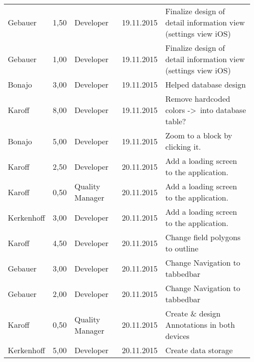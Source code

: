 \begin{longtable}{ l r p{2cm} c p{4cm} }
		Gebauer                 & 1,50           & Developer             & 19.11.2015    & Finalize design of detail information view (settings view iOS)                  \\
		Gebauer                 & 1,00           & Developer             & 19.11.2015    & Finalize design of detail information view (settings view iOS)                  \\
		Bonajo                  & 3,00           & Developer             & 19.11.2015    & Helped database design                                                          \\
		Karoff                  & 8,00           & Developer             & 19.11.2015    & Remove hardcoded colors -\textgreater\ into database table?                      \\
		Bonajo                  & 5,00           & Developer             & 19.11.2015    & Zoom to a block by clicking it.                                                 \\
		Karoff                  & 2,50           & Developer             & 20.11.2015    & Add a loading screen to the application.                                        \\
		Karoff                  & 0,50           & Quality Manager       & 20.11.2015    & Add a loading screen to the application.                                        \\
		Kerkenhoff              & 3,00           & Developer             & 20.11.2015    & Add a loading screen to the application.                                        \\
		Karoff                  & 4,50           & Developer             & 20.11.2015    & Change field polygons to outline                                                \\
		Gebauer                 & 3,00           & Developer             & 20.11.2015    & Change Navigation to tabbedbar                                                  \\
		Gebauer                 & 2,00           & Developer             & 20.11.2015    & Change Navigation to tabbedbar                                                  \\
		Karoff                  & 0,50           & Quality Manager       & 20.11.2015    & Create \& design Annotations in both devices                                    \\
		Kerkenhoff              & 5,00           & Developer             & 20.11.2015    & Create data storage                                                             \\

\end{longtable}
